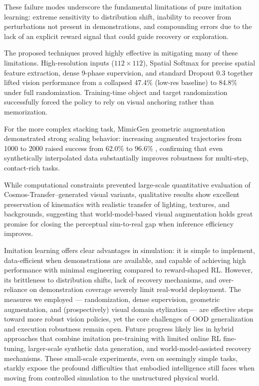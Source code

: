 \documentclass{article} %
\begin{document}
These failure modes underscore the fundamental limitations of pure imitation learning: extreme sensitivity to distribution shift, inability to recover from perturbations not present in demonstrations, and compounding errors due to the lack of an explicit reward signal that could guide recovery or exploration.

The proposed techniques proved highly effective in mitigating many of these limitations. High-resolution inputs ($112 \times 112$), Spatial Softmax for precise spatial feature extraction, dense 9-phase supervision, and standard Dropout 0.3 together lifted vision performance from a collapsed  47.4\%  (low-res baseline) to  84.8\%  under full randomization. Training-time object and target randomization successfully forced the policy to rely on visual anchoring rather than memorization.

For the more complex stacking task, MimicGen geometric augmentation demonstrated strong scaling behavior: increasing augmented trajectories from 1000 to 2000 raised success from  62.0\%  to  96.6\% , confirming that even synthetically interpolated data substantially improves robustness for multi-step, contact-rich tasks.

While computational constraints prevented large-scale quantitative evaluation of Cosmos-Transfer–generated visual variants, qualitative results show excellent preservation of kinematics with realistic transfer of lighting, textures, and backgrounds, suggesting that world-model-based visual augmentation holds great promise for closing the perceptual sim-to-real gap when inference efficiency improves.

Imitation learning offers clear advantages in simulation: it is simple to implement, data-efficient when demonstrations are available, and capable of achieving high performance with minimal engineering compared to reward-shaped RL. However, its brittleness to distribution shifts, lack of recovery mechanisms, and over-reliance on demonstration coverage severely limit real-world deployment. The measures we employed — randomization, dense supervision, geometric augmentation, and (prospectively) visual domain stylization — are effective steps toward more robust vision policies, yet the core challenges of OOD generalization and execution robustness remain open. Future progress likely lies in hybrid approaches that combine imitation pre-training with limited online RL fine-tuning, larger-scale synthetic data generation, and world-model-assisted recovery mechanisms. These small-scale experiments, even on seemingly simple tasks, starkly expose the profound difficulties that embodied intelligence still faces when moving from controlled simulation to the unstructured physical world.
\end{document}
